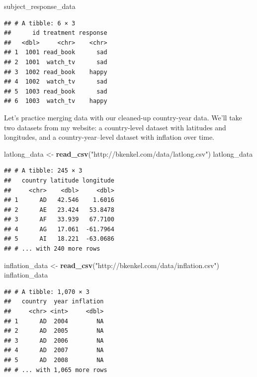 \documentclass[12pt,oneside,openany]{tufte-book}
\newenvironment{Shaded}{}{}
\newcommand{\KeywordTok}[1]{\textcolor[rgb]{0.00,0.44,0.13}{\textbf{{#1}}}}
\newcommand{\StringTok}[1]{\textcolor[rgb]{0.25,0.44,0.63}{{#1}}}
\newcommand{\NormalTok}[1]{{#1}}
\begin{document}
\begin{Shaded}
\begin{Highlighting}[]
\NormalTok{subject_response_data}
\end{Highlighting}
\end{Shaded}

\begin{verbatim}
## # A tibble: 6 × 3
##      id treatment response
##   <dbl>     <chr>    <chr>
## 1  1001 read_book      sad
## 2  1001  watch_tv      sad
## 3  1002 read_book    happy
## 4  1002  watch_tv      sad
## 5  1003 read_book      sad
## 6  1003  watch_tv    happy
\end{verbatim}

Let's practice merging data with our cleaned-up country-year data. We'll
take two datasets from my website: a country-level dataset with
latitudes and longitudes, and a country-year--level dataset with
inflation over time.

\begin{Shaded}
\begin{Highlighting}[]
\NormalTok{latlong_data <-}\StringTok{ }\KeywordTok{read_csv}\NormalTok{(}\StringTok{"http://bkenkel.com/data/latlong.csv"}\NormalTok{)}
\NormalTok{latlong_data}
\end{Highlighting}
\end{Shaded}

\begin{verbatim}
## # A tibble: 245 × 3
##   country latitude longitude
##     <chr>    <dbl>     <dbl>
## 1      AD   42.546    1.6016
## 2      AE   23.424   53.8478
## 3      AF   33.939   67.7100
## 4      AG   17.061  -61.7964
## 5      AI   18.221  -63.0686
## # ... with 240 more rows
\end{verbatim}

\begin{Shaded}
\begin{Highlighting}[]
\NormalTok{inflation_data <-}\StringTok{ }\KeywordTok{read_csv}\NormalTok{(}\StringTok{"http://bkenkel.com/data/inflation.csv"}\NormalTok{)}
\NormalTok{inflation_data}
\end{Highlighting}
\end{Shaded}

\begin{verbatim}
## # A tibble: 1,070 × 3
##   country  year inflation
##     <chr> <int>     <dbl>
## 1      AD  2004        NA
## 2      AD  2005        NA
## 3      AD  2006        NA
## 4      AD  2007        NA
## 5      AD  2008        NA
## # ... with 1,065 more rows
\end{verbatim}
\end{document}

